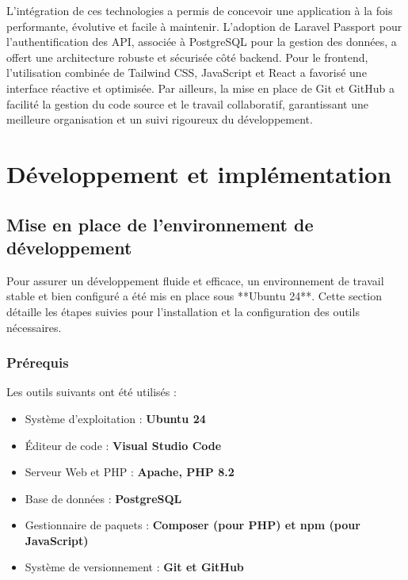 L’intégration de ces technologies a permis de concevoir une application à la fois performante, évolutive et facile à maintenir. L’adoption de Laravel Passport pour l’authentification des API, associée à PostgreSQL pour la gestion des données, a offert une architecture robuste et sécurisée côté backend. Pour le frontend, l’utilisation combinée de Tailwind CSS, JavaScript et React a favorisé une interface réactive et optimisée. Par ailleurs, la mise en place de Git et GitHub a facilité la gestion du code source et le travail collaboratif, garantissant une meilleure organisation et un suivi rigoureux du développement.

\section{Développement et implémentation}

\subsection{Mise en place de l’environnement de développement}


Pour assurer un développement fluide et efficace, un environnement de travail stable et bien configuré a été mis en place sous **Ubuntu 24**. Cette section détaille les étapes suivies pour l’installation et la configuration des outils nécessaires.

\subsubsection{Prérequis}
Les outils suivants ont été utilisés :
\begin{itemize}
    \item Système d’exploitation : \textbf{Ubuntu 24}
    \item Éditeur de code : \textbf{Visual Studio Code}
    \item Serveur Web et PHP : \textbf{Apache, PHP 8.2}
    \item Base de données : \textbf{PostgreSQL}
    \item Gestionnaire de paquets : \textbf{Composer (pour PHP) et npm (pour JavaScript)}
    \item Système de versionnement : \textbf{Git et GitHub}
\end{itemize}

